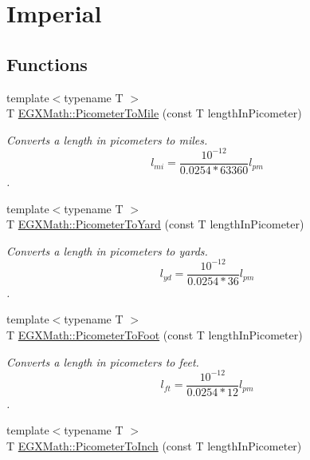 \hypertarget{group___e_g_x_math-_conversions-_length_conversions-_s_i-_picometer-_imperial}{}\section{Imperial}
\label{group___e_g_x_math-_conversions-_length_conversions-_s_i-_picometer-_imperial}
\subsection*{Functions}
\begin{DoxyCompactItemize}
\item 
{\footnotesize template$<$typename T $>$ }\\T \mbox{\hyperlink{group___e_g_x_math-_conversions-_length_conversions-_s_i-_picometer-_imperial_gae153bd94c8377dd95b8b09bcc56256b0}{E\+G\+X\+Math\+::\+Picometer\+To\+Mile}} (const T length\+In\+Picometer)
\begin{DoxyCompactList}\small\item\em Converts a length in picometers to miles. \[ l_{mi}=\frac{10^{-12}}{0.0254 * 63360} l_{pm} \]. \end{DoxyCompactList}\item 
{\footnotesize template$<$typename T $>$ }\\T \mbox{\hyperlink{group___e_g_x_math-_conversions-_length_conversions-_s_i-_picometer-_imperial_ga18b17a118ffb1092beefc221f44a97a2}{E\+G\+X\+Math\+::\+Picometer\+To\+Yard}} (const T length\+In\+Picometer)
\begin{DoxyCompactList}\small\item\em Converts a length in picometers to yards. \[ l_{yd}= \frac{10^{-12}}{0.0254 * 36} l_{pm} \]. \end{DoxyCompactList}\item 
{\footnotesize template$<$typename T $>$ }\\T \mbox{\hyperlink{group___e_g_x_math-_conversions-_length_conversions-_s_i-_picometer-_imperial_gae83808c99fe5c49c54717302f667ff46}{E\+G\+X\+Math\+::\+Picometer\+To\+Foot}} (const T length\+In\+Picometer)
\begin{DoxyCompactList}\small\item\em Converts a length in picometers to feet. \[ l_{ft}= \frac{10^{-12}}{0.0254 * 12} l_{pm} \]. \end{DoxyCompactList}\item 
{\footnotesize template$<$typename T $>$ }\\T \mbox{\hyperlink{group___e_g_x_math-_conversions-_length_conversions-_s_i-_picometer-_imperial_ga163afd72563986ed456466be07efd3cb}{E\+G\+X\+Math\+::\+Picometer\+To\+Inch}} (const T length\+In\+Picometer)

\end{DoxyCompactItemize}
